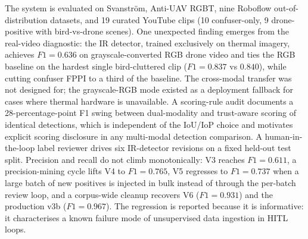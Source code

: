 \documentclass[12pt,a4paper,oneside,openright]{book}
\begin{document}
The system is evaluated on Svanstr\"om, Anti-UAV RGBT, nine Roboflow out-of-distribution datasets, and 19 curated YouTube clips (10 confuser-only, 9 drone-positive with bird-vs-drone scenes). One unexpected finding emerges from the real-video diagnostic: the IR detector, trained exclusively on thermal imagery, achieves $F1=0.636$ on grayscale-converted RGB drone video and ties the RGB baseline on the hardest single bird-cluttered clip ($F1=0.837$ vs $0.840$), while cutting confuser FPPI to a third of the baseline. The cross-modal transfer was not designed for; the grayscale-RGB mode existed as a deployment fallback for cases where thermal hardware is unavailable. A scoring-rule audit documents a 28-percentage-point F1 swing between dual-modality and trust-aware scoring of identical detections, which is independent of the IoU/IoP choice and motivates explicit scoring disclosure in any multi-modal detection comparison. A human-in-the-loop label reviewer drives six IR-detector revisions on a fixed held-out test split. Precision and recall do not climb monotonically: V3 reaches $F1=0.611$, a precision-mining cycle lifts V4 to $F1=0.765$, V5 regresses to $F1=0.737$ when a large batch of new positives is injected in bulk instead of through the per-batch review loop, and a corpus-wide cleanup recovers V6 ($F1=0.931$) and the production v3b ($F1=0.967$). The regression is reported because it is informative: it characterises a known failure mode of unsupervised data ingestion in HITL loops.

\tableofcontents
\newpage
{}
\setcounter{chapter}{0}


% 








\backmatter
\sloppy
\printbibliography[heading=bibintoc, title=Bibliography]

\end{document}
